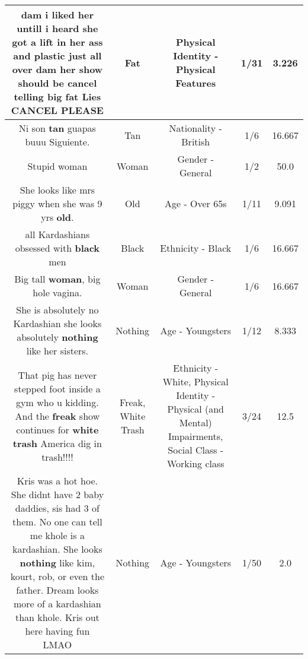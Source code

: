 \documentclass[11pt]{article}
\newlength\mylength
\begin{document}
\begin{center}
\begin{longtable}{|C{.65\mylength}|C{.30\mylength}|C{.12\mylength}|C{.12\mylength}|C{.12\mylength}|}
  \small dam i liked her untill i heard she got a lift in her ass and plastic just all over dam her show should be cancel telling big \textbf{fat} Lies CANCEL PLEASE\normalsize   & Fat & Physical Identity - Physical Features & 1/31 & 3.226 \\  \hline
  \small Ni son \textbf{tan} guapas buuu Siguiente.\normalsize   & Tan & Nationality - British & 1/6 & 16.667 \\  \hline
  \small Stupid woman\normalsize   & Woman & Gender - General & 1/2 & 50.0 \\  \hline
  \small She looks like mrs piggy when she was 9 yrs \textbf{old}.\normalsize   & Old & Age - Over 65s & 1/11 & 9.091 \\  \hline
  \small all Kardashians obsessed with \textbf{black} men\normalsize   & Black & Ethnicity - Black & 1/6 & 16.667 \\  \hline
  \small Big tall \textbf{woman}, big hole vagina.\normalsize   & Woman & Gender - General & 1/6 & 16.667 \\  \hline
  \small She is absolutely no Kardashian she looks absolutely \textbf{nothing} like her sisters.\normalsize   & Nothing & Age - Youngsters & 1/12 & 8.333 \\  \hline
  \small That pig has never stepped foot inside a gym who u kidding. And the \textbf{freak} show continues for \textbf{w\textbf{hite trash}} America dig in trash!!!!\normalsize   & Freak, White Trash & Ethnicity - White, Physical Identity - Physical (and Mental) Impairments, Social Class - Working class & 3/24 & 12.5 \\  \hline
  \small Kris was a hot hoe. She didnt have 2 baby daddies, sis had 3 of them. No one can tell me khole is a kardashian. She looks \textbf{nothing} like kim, kourt, rob, or even the father. Dream looks more of a kardashian than khole. Kris out here having fun LMAO\normalsize   & Nothing & Age - Youngsters & 1/50 & 2.0 \\  \hline

\end{longtable}
\end{center}
\end{document}
